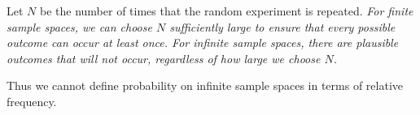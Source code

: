 \par\vspace*{2ex}
Let $N$ be the number of times that the random experiment is repeated.
\bit
\it For finite sample spaces, we can choose $N$ sufficiently large to ensure that every possible outcome can occur at least once.
\it For infinite sample spaces, there are plausible outcomes that will not occur, regardless of how large we choose $N$. 
\eit

Thus we cannot define probability on infinite sample spaces in terms of relative frequency.


%
%

%
%
%

